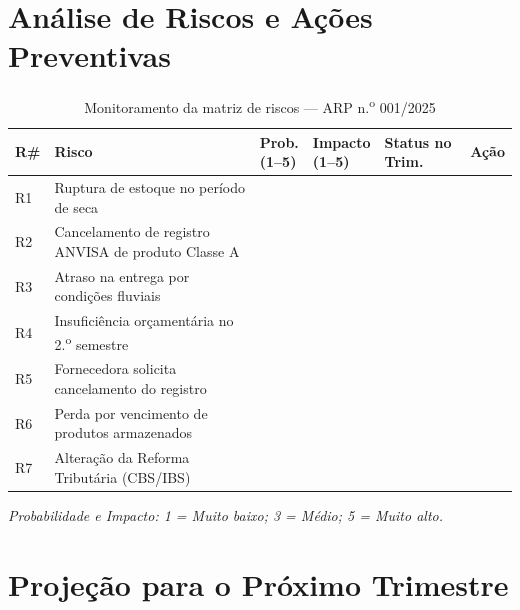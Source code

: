 \documentclass[12pt,a4paper]{article}
\newcommand{\arpRef}{ARP n.\textsuperscript{o} 001/2025}
\begin{document}
\section{Análise de Riscos e Ações Preventivas}

\begin{table}[H]\centering
\caption{Monitoramento da matriz de riscos --- \arpRef}
\small{}
\begin{tabular}{C{0.6cm} L{4.0cm} C{1.5cm} C{1.5cm} L{3.0cm} C{1.5cm}}
  \color{white}\textbf{R\#} &
  \color{white}\textbf{Risco} &
  \color{white}\textbf{Prob.\newline (1--5)} &
  \color{white}\textbf{Impacto\newline (1--5)} &
  \color{white}\textbf{Status no Trim.} &
  \color{white}\textbf{Ação} \\
  \toprule
  R1 & Ruptura de estoque no período de seca
     & & & & \\
  R2 & Cancelamento de registro ANVISA de produto Classe A
     & & & & \\
  R3 & Atraso na entrega por condições fluviais
     & & & & \\
  R4 & Insuficiência orçamentária no 2.\textsuperscript{o} semestre
     & & & & \\
  R5 & Fornecedora solicita cancelamento do registro
     & & & & \\
  R6 & Perda por vencimento de produtos armazenados
     & & & & \\
  R7 & Alteração da Reforma Tributária (CBS/IBS)
     & & & & \\
  \bottomrule
\end{tabular}
\end{table}

\noindent\small\textit{Probabilidade e Impacto: 1 = Muito baixo; 3 = Médio;
5 = Muito alto.}

\section{Projeção para o Próximo Trimestre}
\end{document}
